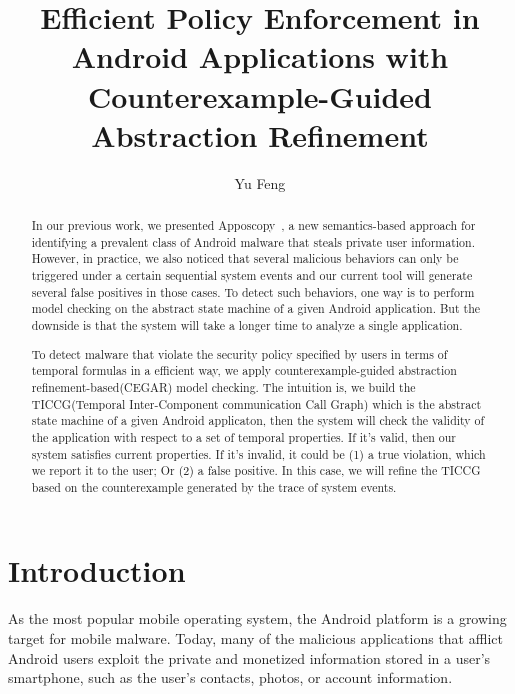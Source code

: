 \documentclass{article}
\begin{document}
\title{Efficient Policy Enforcement in Android Applications with Counterexample-Guided Abstraction Refinement}
\author{Yu Feng}

\maketitle

\begin{abstract}
In our previous work, we presented Apposcopy~\cite{apposcopy}, a new semantics-based approach 
for identifying a prevalent class of Android malware that steals 
private user information. However, in practice, we also noticed 
that several malicious behaviors can only be triggered under a 
certain sequential system events and our current tool will generate 
several false positives in those cases. To detect such behaviors, 
one way is to perform model checking on the abstract state 
machine of a given Android application.
But the downside is that the system will take a longer time to analyze
a single application. 

To detect malware that violate the security policy specified by users 
in terms of temporal formulas in a efficient way, we apply 
counterexample-guided abstraction refinement-based(CEGAR) model 
checking. The intuition is, we build the TICCG(Temporal Inter-Component 
communication Call Graph) which is the abstract state machine of a given 
Android applicaton, then the system will check the validity of the application
with respect to a set of temporal properties. If it's valid, then 
our system satisfies current properties. If it's invalid, it could
be (1) a true violation, which we report it to the user; Or (2)
a false positive. In this case, we will refine the TICCG based on
the counterexample generated by the trace of system events.
\end{abstract}


\section{Introduction}
As the most popular mobile operating system, the Android platform 
is a growing target for  mobile malware.
Today, many of the malicious applications that afflict  Android users  exploit
the private and monetized information
stored in a user's smartphone, such as the user's contacts, photos, or
account information. 
\end{document}
